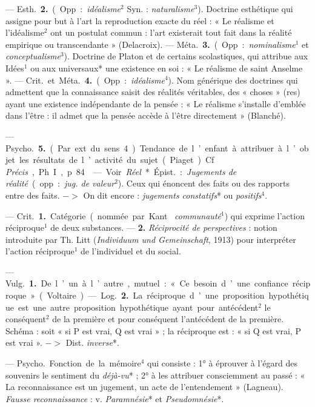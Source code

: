 \begin{itemize}[leftmargin=1cm, label=, itemsep=1pt]
—  \si{Esth.} {\bf 2.} (Opp. : {\it idéalisme}$^2$ Syn. : {\it
naturalisme}$^3$). Doctrine esthétique qui assigne pour but à l’art la
reproduction exacte du réel : « Le réalisme et l’idéalisme$^2$ ont un postulat
commun : l'art existerait tout fait dans la réalité empirique ou
transcendante » (Delacroix). — \si{Méta.} {\bf 3.} (Opp. :
{\it nominalisme}$^1$ et {\it conceptualisme}$^3$). Doctrine de Platon et de
certains scolastiques, qui attribue aux Idées$^1$ ou aux universaux* une
existence en soi : « Le réalisme de saint Anselme ». — \si{Crit.} et
\si{Méta.} {\bf 4.} (Opp. : {\it idéalisme}$^4$). Nom générique des doctrines
qui admettent que la connaissance saisit des réalités véritables, des «
choses » (res) ayant une existence indépendante de la pensée : « Le réalisme
s’installe d'emblée dans l'être : il admet que la pensée accède à l'être
directement » (Blanché).

— \si{Psycho.} {\bf 5.} (Par ext. du sens 4). Tendance de l’enfant à
attribuer à l’objet les résultats de l’activité du sujet (Piaget). Cf. {\it
Précis}, Ph. I, p. 84.

 — Voir {\it Réel}*. \si{Épist.} : {\it Jugements de réalité}
(opp. : {\it jug. de valeur}$^2$). Ceux qui énoncent des faits ou des
rapports entre des faits. $->$ On dit encore : {\it jugements constatifs}* ou
{\it positifs}$^4$.

 — \si{Crit.} {\bf 1.} Catégorie (nommée par Kant {\it
communauté}$^1$) qui exprime l’action réciproque$^1$ de deux substances. —
{\bf 2.} {\it Réciprocité de perspectives} : notion introduite par Th. Litt
({\it Individuum und Gemeinschaft}, 1913) pour interpréter l’action
réciproque$^1$ de l'individuel et du social.

 — \si{Vulg.} {\bf 1.} De l’un à l’autre, mutuel : « Ce besoin
d’une confiance réciproque » (Voltaire). — \si{Log.} {\bf 2.} La réciproque
d’une proposition hypothétique est une autre proposition hypothétique ayant
pour antécédent$^2$ le conséquent$^2$ de la première et pour conséquent
l’antécédent
de la première. Schéma : soit « si P est vrai, Q est vrai » ; la réciproque
est : « si Q est vrai, P est vrai ». $->$ Dist. {\it inverse}*.

 — \si{Psycho.} Fonction de la mémoire$^4$ qui consiste :
1° à éprouver à l’égard des souvenirs le sentiment du {\it déjà-vu}* ; 2° à
les attribuer consciemment au passé : « La reconnaissance est un jugement, un
acte de l’entendement » (Lagneau). {\it Fausse reconnaissance} : v. {\it
Paramnésie}* et {\it Pseudomnésie}*.


\end{itemize}
